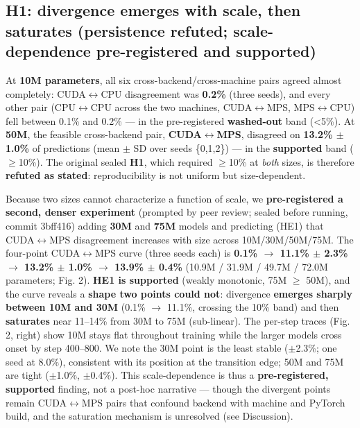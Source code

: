 \documentclass{article}
\begin{document}
\subsection{H1: divergence emerges with scale, then saturates (persistence refuted; scale-dependence pre-registered and supported)}\label{h1-divergence-emerges-with-scale-then-saturates-persistence-refuted-scale-dependence-pre-registered-and-supported}

At \textbf{10M parameters}, all six cross-backend/cross-machine pairs agreed almost completely:
CUDA$\leftrightarrow$CPU disagreement was \textbf{0.2\%} (three seeds), and every other pair (CPU$\leftrightarrow$CPU across the two
machines, CUDA$\leftrightarrow$MPS, MPS$\leftrightarrow$CPU) fell between 0.1\% and 0.2\% --- in the pre-registered \textbf{washed-out}
band (\textless5\%). At \textbf{50M}, the feasible cross-backend pair, \textbf{CUDA$\leftrightarrow$MPS}, disagreed on
\textbf{13.2\% $\pm$ 1.0\%} of predictions (mean $\pm$ SD over seeds \{0,1,2\}) --- in the \textbf{supported} band
($\ge$10\%). The original sealed \textbf{H1}, which required $\ge$10\% at \emph{both} sizes, is therefore \textbf{refuted
as stated}: reproducibility is not uniform but size-dependent.

Because two sizes cannot characterize a function of scale, we \textbf{pre-registered a second,
denser experiment} (prompted by peer review; sealed before running, commit 3bff416) adding
\textbf{30M} and \textbf{75M} models and predicting (HE1) that CUDA$\leftrightarrow$MPS disagreement increases with size
across 10M/30M/50M/75M. The four-point CUDA$\leftrightarrow$MPS curve (three seeds each) is
\textbf{0.1\% $\rightarrow$ 11.1\% $\pm$ 2.3\% $\rightarrow$ 13.2\% $\pm$ 1.0\% $\rightarrow$ 13.9\% $\pm$ 0.4\%} (10.9M / 31.9M / 49.7M / 72.0M
parameters; Fig. 2). \textbf{HE1 is supported} (weakly monotonic, 75M $\ge$ 50M), and the curve reveals
a \textbf{shape two points could not}: divergence \textbf{emerges sharply between 10M and 30M}
(0.1\% $\rightarrow$ 11.1\%, crossing the 10\% band) and then \textbf{saturates} near 11--14\% from 30M to 75M
(sub-linear). The per-step traces (Fig. 2, right) show 10M stays flat throughout training while
the larger models cross onset by step 400--800. We note the 30M point is the least stable
($\pm$2.3\%; one seed at 8.0\%), consistent with its position at the transition edge; 50M and 75M are
tight ($\pm$1.0\%, $\pm$0.4\%). This scale-dependence is thus a \textbf{pre-registered, supported} finding, not
a post-hoc narrative --- though the divergent points remain CUDA$\leftrightarrow$MPS pairs that confound backend
with machine and PyTorch build, and the saturation mechanism is unresolved (see Discussion).
\end{document}
